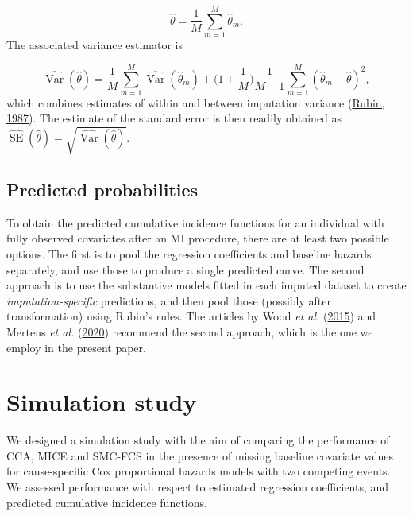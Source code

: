 \documentclass[
  letterpaper,
  DIV=11,
  numbers=noendperiod]{scrreprt}
\DeclareMathOperator{\Var}{Var}
\DeclareMathOperator{\SE}{SE}
\begin{document}
\begin{equation*}
    \hat{\theta} = \frac{1}{M}\sum_{m=1}^{M}\hat{\theta}_m.
\end{equation*} The associated variance estimator is

\begin{equation*}
    \widehat{\Var}(\hat{\theta}) = \frac{1}{M}\sum_{m=1}^{M}\widehat{\Var}(\hat{\theta}_m) + \big(1 + \frac{1}{M}\big)\frac{1}{M-1}\sum_{m=1}^{M}(\hat{\theta}_m - \hat{\theta})^2,
\end{equation*} which combines estimates of within and between
imputation variance (\protect\hyperlink{ref-rubin:1987}{Rubin, 1987}).
The estimate of the standard error is then readily obtained as
\(\widehat{\SE}(\hat{\theta}) = \sqrt{\widehat{\Var}(\hat{\theta})}\).

\hypertarget{predicted-probabilities}{%
\subsection{Predicted probabilities}\label{predicted-probabilities}}

To obtain the predicted cumulative incidence functions for an individual
with fully observed covariates after an MI procedure, there are at least
two possible options. The first is to pool the regression coefficients
and baseline hazards separately, and use those to produce a single
predicted curve. The second approach is to use the substantive models
fitted in each imputed dataset to create \emph{imputation-specific}
predictions, and then pool those (possibly after transformation) using
Rubin's rules. The articles by Wood \emph{et al.}
(\protect\hyperlink{ref-woodEstimationUsePredictions2015}{2015}) and
Mertens \emph{et al.}
(\protect\hyperlink{ref-mertensConstructionAssessmentPrediction2020}{2020})
recommend the second approach, which is the one we employ in the present
paper.

\hypertarget{sec-simstudy}{%
\section{Simulation study}\label{sec-simstudy}}

We designed a simulation study with the aim of comparing the performance
of CCA, MICE and SMC-FCS in the presence of missing baseline covariate
values for cause-specific Cox proportional hazards models with two
competing events. We assessed performance with respect to estimated
regression coefficients, and predicted cumulative incidence functions.
\end{document}
